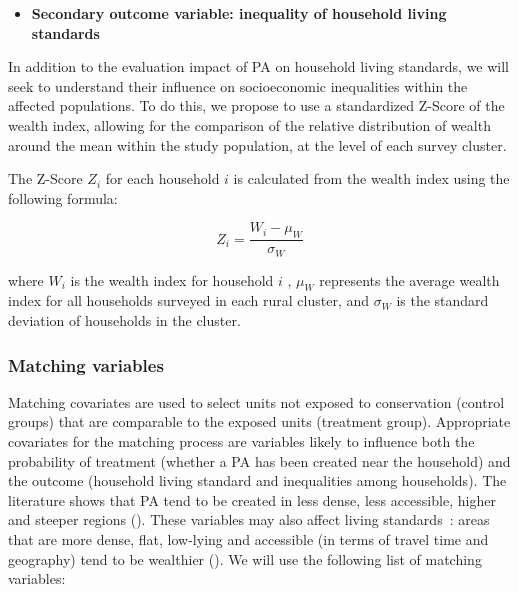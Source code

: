 \documentclass[
]{article}
\providecommand{\tightlist}{%
  \setlength{\itemsep}{0pt}\setlength{\parskip}{0pt}}\usepackage{longtable,booktabs,array}
\begin{document}

\begin{itemize}
\tightlist
\item
  \textbf{Secondary outcome variable: inequality of household living
  standards}
\end{itemize}

In addition to the evaluation impact of PA on household living
standards, we will seek to understand their influence on socioeconomic
inequalities within the affected populations. To do this, we propose to
use a standardized Z-Score of the wealth index, allowing for the
comparison of the relative distribution of wealth around the mean within
the study population, at the level of each survey cluster.

The Z-Score \(Z_i\) for each household \(i\) is calculated from the
wealth index using the following formula:

\[
Z_i = \frac{W_i - \mu_W}{\sigma_W}
\]

where \(W_i\) is the wealth index for household \(i\) , \(μ_W\)
represents the average wealth index for all households surveyed in each
rural cluster, and \(σ_W\) is the standard deviation of households in
the cluster.

\subsubsection{Matching variables}\label{matching-variables}

Matching covariates are used to select units not exposed to conservation
(control groups) that are comparable to the exposed units (treatment
group). Appropriate covariates for the matching process are variables
likely to influence both the probability of treatment (whether a PA has
been created near the household) and the outcome (household living
standard and inequalities among households). The literature shows that
PA tend to be created in less dense, less accessible, higher and steeper
regions ().
These variables may also affect living standards~: areas that are more
dense, flat, low-lying and accessible (in terms of travel time and
geography) tend to be wealthier
(). We will use
the following list of matching variables:
\end{document}
